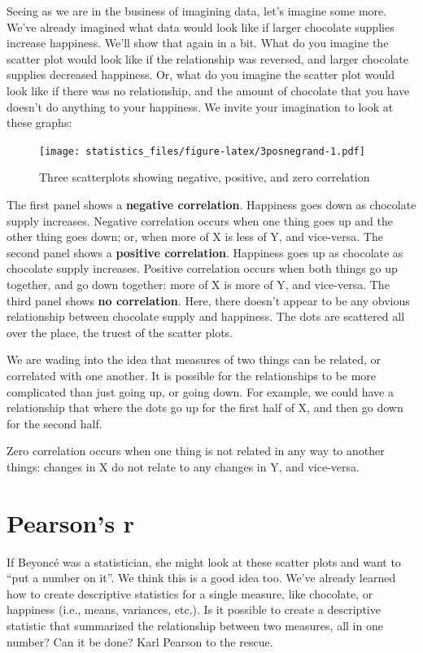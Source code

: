 \documentclass[]{book}
\begin{document}
Seeing as we are in the business of imagining data, let's imagine some more. We've already imagined what data would look like if larger chocolate supplies increase happiness. We'll show that again in a bit. What do you imagine the scatter plot would look like if the relationship was reversed, and larger chocolate supplies decreased happiness. Or, what do you imagine the scatter plot would look like if there was no relationship, and the amount of chocolate that you have doesn't do anything to your happiness. We invite your imagination to look at these graphs:

\begin{figure}
\centering
\texttt{[image: statistics\_files/figure-latex/3posnegrand-1.pdf]}
\caption{\label{fig:3posnegrand}Three scatterplots showing negative, positive, and zero correlation}
\end{figure}

The first panel shows a \textbf{negative correlation}. Happiness goes down as chocolate supply increases. Negative correlation occurs when one thing goes up and the other thing goes down; or, when more of X is less of Y, and vice-versa. The second panel shows a \textbf{positive correlation}. Happiness goes up as chocolate as chocolate supply increases. Positive correlation occurs when both things go up together, and go down together: more of X is more of Y, and vice-versa. The third panel shows \textbf{no correlation}. Here, there doesn't appear to be any obvious relationship between chocolate supply and happiness. The dots are scattered all over the place, the truest of the scatter plots.

We are wading into the idea that measures of two things can be related, or correlated with one another. It is possible for the relationships to be more complicated than just going up, or going down. For example, we could have a relationship that where the dots go up for the first half of X, and then go down for the second half.

Zero correlation occurs when one thing is not related in any way to another things: changes in X do not relate to any changes in Y, and vice-versa.

\hypertarget{pearsons-r}{%
\section{Pearson's r}\label{pearsons-r}}

If Beyoncé was a statistician, she might look at these scatter plots and want to ``put a number on it''. We think this is a good idea too. We've already learned how to create descriptive statistics for a single measure, like chocolate, or happiness (i.e., means, variances, etc.). Is it possible to create a descriptive statistic that summarized the relationship between two measures, all in one number? Can it be done? Karl Pearson to the rescue.
\end{document}
